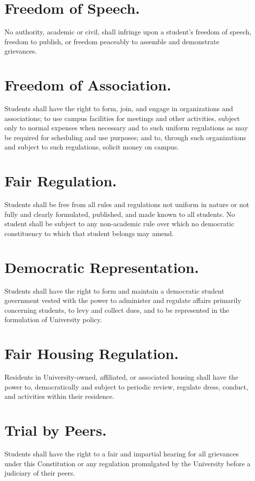 \section{Freedom of Speech.}
    No authority, academic or civil, shall infringe upon a student's freedom of speech, freedom to publish, or freedom peaceably to assemble and demonstrate grievances.

\section{Freedom of Association.}
    Students shall have the right to form, join, and engage in organizations and associations; to use campus facilities for meetings and other activities, subject only to normal expenses when necessary and to such uniform regulations as may be required for scheduling and use purposes; and to, through such organizations and subject to such regulations, solicit money on campus.


\section{Fair Regulation.}
    Students shall be free from all rules and regulations not uniform in nature or not fully and clearly formulated, published, and made known to all students. No student shall be subject to any non-academic rule over which no democratic constituency to which that student belongs may amend.

\section{Democratic Representation.}
    Students shall have the right to form and maintain a democratic student government vested with the power to administer and regulate affairs primarily concerning students, to levy and collect dues, and to be represented in the formulation of University policy.

\section{Fair Housing Regulation.}
    Residents in University-owned, affiliated, or associated housing shall have the power to, democratically and subject to periodic review, regulate dress, conduct, and activities within their residence.

\section{Trial by Peers.}
    Students shall have the right to a fair and impartial hearing for all grievances under this Constitution or any regulation promulgated by the University before a judiciary of their peers.

